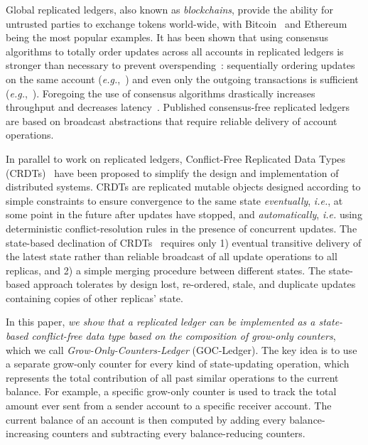 \documentclass[9pt, oneside]{article}   	%
\begin{document}
Global replicated ledgers, also known as \textit{blockchains}, provide the ability for untrusted parties to exchange tokens world-wide, with Bitcoin~\cite{nakamoto2008bitcoin} and Ethereum~\cite{buterin2014next} being the most popular examples. It has been shown that using consensus algorithms to totally order updates across all accounts in replicated ledgers is stronger than necessary to prevent overspending~\cite{guerraoui2021consensus}: sequentially ordering updates on the same account (\textit{e.g.},~\cite{frey:hal-03346756}) and even only the outgoing transactions is sufficient  (\textit{e.g.},~\cite{collins2020broadcast-payment}). Foregoing the use of consensus algorithms drastically increases throughput and decreases latency~\cite{collins2020broadcast-payment,baudet2020fastpay}. Published consensus-free replicated ledgers~\cite{collins2020broadcast-payment,baudet2020fastpay,sliwinski2020abc,guerraoui2021consensus,auvolat2021money,frey:hal-03346756,kuznetsov2021permissionless,cholvi2021bdso,georghiades2021needs} are based on broadcast abstractions that require reliable delivery of account operations. 

In parallel to work on replicated ledgers, Conflict-Free Replicated Data Types (CRDTs)~\cite{shapiro:hal-00932836} have been proposed to simplify the design and implementation of distributed systems. CRDTs are replicated mutable objects designed according to simple constraints to ensure convergence to the same state \textit{eventually}, \textit{i.e.}, at some point in the future after updates have stopped, and \textit{automatically}, \textit{i.e.} using deterministic conflict-resolution rules in the presence of concurrent updates. The state-based declination of CRDTs~\cite{shapiro:hal-00932836} requires only 1) eventual transitive delivery of the latest state rather than reliable broadcast of all update operations to all replicas, and 2) a simple merging procedure between different states. The state-based approach tolerates by design lost, re-ordered, stale, and duplicate updates containing copies of other replicas' state.

In this paper, \textit{we show that a replicated ledger can be implemented as a state-based conflict-free data type based on the composition of grow-only counters}, which we call \textit{Grow-Only-Counters-Ledger} (GOC-Ledger). The key idea is to use a separate grow-only counter for every kind of state-updating operation, which represents the total contribution of all past similar operations to the current balance. For example, a specific grow-only counter is used to track the total amount ever sent  from a sender account to a specific receiver account. The current balance of an account is then computed by adding every balance-increasing counters and subtracting every balance-reducing counters. 
\end{document}
